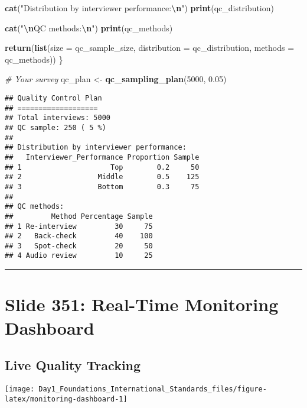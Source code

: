 \documentclass[
]{article}
\newenvironment{Shaded}{\begin{snugshade}}{\end{snugshade}}
\newcommand{\AttributeTok}[1]{\textcolor[rgb]{0.13,0.29,0.53}{#1}}
\newcommand{\CommentTok}[1]{\textcolor[rgb]{0.56,0.35,0.01}{\textit{#1}}}
\newcommand{\DecValTok}[1]{\textcolor[rgb]{0.00,0.00,0.81}{#1}}
\newcommand{\FloatTok}[1]{\textcolor[rgb]{0.00,0.00,0.81}{#1}}
\newcommand{\FunctionTok}[1]{\textcolor[rgb]{0.13,0.29,0.53}{\textbf{#1}}}
\newcommand{\NormalTok}[1]{#1}
\newcommand{\OtherTok}[1]{\textcolor[rgb]{0.56,0.35,0.01}{#1}}
\newcommand{\SpecialCharTok}[1]{\textcolor[rgb]{0.81,0.36,0.00}{\textbf{#1}}}
\newcommand{\StringTok}[1]{\textcolor[rgb]{0.31,0.60,0.02}{#1}}
\begin{document}
\begin{Shaded}
\begin{Highlighting}[]
  \FunctionTok{cat}\NormalTok{(}\StringTok{"Distribution by interviewer performance:}\SpecialCharTok{\textbackslash{}n}\StringTok{"}\NormalTok{)}
  \FunctionTok{print}\NormalTok{(qc\_distribution)}
  
  \FunctionTok{cat}\NormalTok{(}\StringTok{"}\SpecialCharTok{\textbackslash{}n}\StringTok{QC methods:}\SpecialCharTok{\textbackslash{}n}\StringTok{"}\NormalTok{)}
  \FunctionTok{print}\NormalTok{(qc\_methods)}
  
  \FunctionTok{return}\NormalTok{(}\FunctionTok{list}\NormalTok{(}\AttributeTok{size =}\NormalTok{ qc\_sample\_size,}
              \AttributeTok{distribution =}\NormalTok{ qc\_distribution,}
              \AttributeTok{methods =}\NormalTok{ qc\_methods))}
\NormalTok{\}}

\CommentTok{\# Your survey}
\NormalTok{qc\_plan }\OtherTok{\textless{}{-}} \FunctionTok{qc\_sampling\_plan}\NormalTok{(}\DecValTok{5000}\NormalTok{, }\FloatTok{0.05}\NormalTok{)}
\end{Highlighting}
\end{Shaded}

\begin{verbatim}
## Quality Control Plan
## ===================
## Total interviews: 5000 
## QC sample: 250 ( 5 %)
## 
## Distribution by interviewer performance:
##   Interviewer_Performance Proportion Sample
## 1                     Top        0.2     50
## 2                  Middle        0.5    125
## 3                  Bottom        0.3     75
## 
## QC methods:
##         Method Percentage Sample
## 1 Re-interview         30     75
## 2   Back-check         40    100
## 3   Spot-check         20     50
## 4 Audio review         10     25
\end{verbatim}

\begin{center}\rule{0.5\linewidth}{0.5pt}\end{center}

\section{Slide 351: Real-Time Monitoring
Dashboard}\label{slide-351-real-time-monitoring-dashboard}

\subsection{Live Quality Tracking}\label{live-quality-tracking}

\texttt{[image: Day1\_Foundations\_International\_Standards\_files/figure-latex/monitoring-dashboard-1]}
\end{document}
